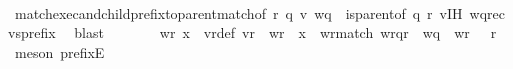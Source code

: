 \begin{isabellebody}
\ \ \ \ \ \ \isamarkupfalse%
\ match{\isacharunderscore}{\kern0pt}exec{\isacharunderscore}{\kern0pt}and{\isacharunderscore}{\kern0pt}child{\isacharunderscore}{\kern0pt}prefix{\isacharunderscore}{\kern0pt}to{\isacharunderscore}{\kern0pt}parent{\isacharunderscore}{\kern0pt}match{\isacharbrackleft}{\kern0pt}of\ r\ q\ {\isachardoublequoteopen}{\isacharquery}{\kern0pt}v{\isacharprime}{\kern0pt}{\isachardoublequoteclose}\ wq{\isacharbrackright}{\kern0pt}\ \ {\isacartoucheopen}is{\isacharunderscore}{\kern0pt}parent{\isacharunderscore}{\kern0pt}of\ q\ r{\isacartoucheclose}\ v{\isacharunderscore}{\kern0pt}IH\ wq{\isacharunderscore}{\kern0pt}recvs{\isacharunderscore}{\kern0pt}prefix\ \isamarkupfalse%
\ blast\isanewline
\ \ \ \ \isamarkupfalse%
\ \isamarkupfalse%
\ wr{\isacharprime}{\kern0pt}\ x{\isacharprime}{\kern0pt}\ \ v{\isacharprime}{\kern0pt}r{\isacharunderscore}{\kern0pt}def{\isacharcolon}{\kern0pt}\ {\isachardoublequoteopen}{\isacharparenleft}{\kern0pt}{\isacharparenleft}{\kern0pt}{\isacharquery}{\kern0pt}v{\isacharprime}{\kern0pt}{\isacharparenright}{\kern0pt}{\isasymdown}\isactrlsub r{\isacharparenright}{\kern0pt}\ {\isacharequal}{\kern0pt}\ wr{\isacharprime}{\kern0pt}\ {\isasymsqdot}\ x{\isacharprime}{\kern0pt}{\isachardoublequoteclose}\ \ wr{\isacharprime}{\kern0pt}{\isacharunderscore}{\kern0pt}match{\isacharcolon}{\kern0pt}\ {\isachardoublequoteopen}{\isacharparenleft}{\kern0pt}{\isacharparenleft}{\kern0pt}{\isacharparenleft}{\kern0pt}wr{\isacharprime}{\kern0pt}{\isasymdown}\isactrlsub {\isacharbang}{\kern0pt}{\isacharparenright}{\kern0pt}{\isasymdown}\isactrlsub {\isacharbraceleft}{\kern0pt}\isactrlsub q\isactrlsub {\isacharcomma}{\kern0pt}\isactrlsub r\isactrlsub {\isacharbraceright}{\kern0pt}{\isacharparenright}{\kern0pt}{\isasymdown}\isactrlsub {\isacharbang}{\kern0pt}\isactrlsub {\isacharquery}{\kern0pt}{\isacharparenright}{\kern0pt}\ {\isacharequal}{\kern0pt}\ {\isacharparenleft}{\kern0pt}{\isacharparenleft}{\kern0pt}{\isacharparenleft}{\kern0pt}wq{\isacharparenright}{\kern0pt}{\isasymdown}\isactrlsub {\isacharquery}{\kern0pt}{\isacharparenright}{\kern0pt}{\isasymdown}\isactrlsub {\isacharbang}{\kern0pt}\isactrlsub {\isacharquery}{\kern0pt}{\isacharparenright}{\kern0pt}{\isachardoublequoteclose}\ \ {\isachardoublequoteopen}wr{\isacharprime}{\kern0pt}\ {\isasymin}\ {\isasymL}\isactrlsup {\isacharasterisk}{\kern0pt}\ r{\isachardoublequoteclose}\ \isamarkupfalse%
\ {\isacharparenleft}{\kern0pt}meson\ prefixE{\isacharparenright}{\kern0pt}\isanewline

\end{isabellebody}
